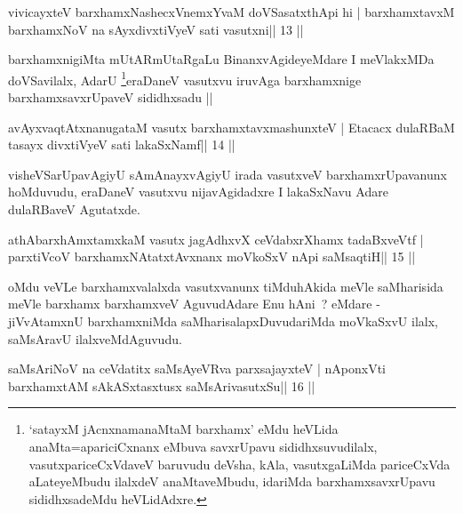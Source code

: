 
\begin{shl}
vivicayxteV barxhamxNashecxVnemxYvaM doVSasatxthA\s pi hi |
barxhamxtavxM barxhamxNoV na sAyxdivxtiVyeV sati vasutxni\hfill || 13 ||
\end{shl}

\begin{artha}
barxhamxnigiMta mUtARmUtaRgaLu BinanxvAgideyeMdare I meVlakxMDa
doVSavilalx, AdarU \footnote[1]{`satayxM jAcnxnamanaMtaM barxhamx'
  eMdu heVLida anaMta=apariciCxnanx eMbuva savxrUpavu
  sididhxsuvudilalx, vasutxpariceCxVdaveV baruvudu deVsha, kAla,
  vasutxgaLiMda pariceCxVda aLateyeMbudu ilalxdeV anaMtaveMbudu,
  idariMda barxhamxsavxrUpavu sididhxsadeMdu heVLidAdxre.}eraDaneV 
  vasutxvu iruvAga barxhamxnige barxhamxsavxrUpaveV sididhxsadu ||
\end{artha}


\begin{shl}
avAyxvaqtAtxnanugataM vasutx barxhamxtavxmashunxteV |
Etacacx dulaRBaM tasayx divxtiVyeV sati lakaSxNamf\hfill || 14 ||
\end{shl}

\begin{artha}
visheVSarUpavAgiyU sAmAnayxvAgiyU irada vasutxveV barxhamxrUpavanunx hoMduvudu, eraDaneV vasutxvu nijavAgidadxre I lakaSxNavu Adare dulaRBaveV Agutatxde.
\end{artha}


\begin{shl}
athAbarxhAmxtamxkaM vasutx jagAdhxvX ceVdabxrXhamx tadaBxveVtf |
parxtiVcoV barxhamxNA\s tatxtAvxnanx moVkoSxV nApi saMsaqtiH\hfill || 15 ||
\end{shl}

\begin{artha}
oMdu veVLe barxhamxvalalxda vasutxvanunx tiMduhAkida meVle saMharisida meVle barxhamx barxhamxveV AguvudAdare Enu hAni~? eMdare - jiVvAtamxnU barxhamxniMda saMharisalapxDuvudariMda moVkaSxvU ilalx, saMsAravU ilalxveMdAguvudu.
\end{artha}

\begin{shl}
saMsAriNoV na ceVdatitx saMsAyeVRva parxsajayxteV |
nA\s ponxVti barxhamxtAM sAkASxtasxtusx saMsArivasutxSu\hfill || 16 ||
\end{shl}

